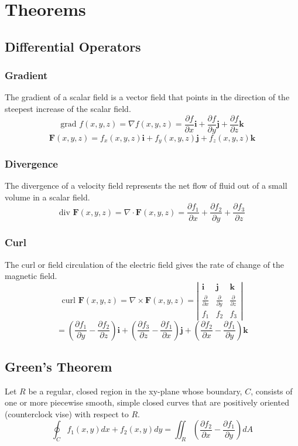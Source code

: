 \section{Theorems}
\subsection{Differential Operators}
\subsubsection{Gradient}
The gradient of a scalar field is a vector field that points in the direction of the steepest increase of the scalar field.
$$\text{grad }f(x,y,z)=\nabla f(x,y,z)=\frac{ \partial f }{ \partial x } \mathbf{i}+\frac{ \partial f }{ \partial y } \mathbf{j}+\frac{ \partial f }{ \partial z } \mathbf{k}$$
$$\mathbf{F}(x,y,z)=f_x(x,y,z)\mathbf{i}+f_y(x,y,z)\mathbf{j}+f_z(x,y,z)\mathbf{k}$$

\subsubsection{Divergence}
The divergence of a velocity field represents the net flow of fluid out of a small volume in a scalar field.
$$\text{div }\mathbf{F}(x,y,z)=\nabla \cdot \mathbf{F}(x,y,z)=\frac{ \partial f_{1} }{ \partial x } +\frac{ \partial f_{2} }{ \partial y } +\frac{ \partial f_{3} }{ \partial z } $$

\subsubsection{Curl}
The curl or field circulation of the electric field gives the rate of change of the magnetic field.
$$\text{curl }\mathbf{F}(x,y,z)
=\nabla \times \mathbf{F}(x,y,z)
=\left|\begin{array}{ccc}\mathbf{i} & \mathbf{j} & \mathbf{k} \\
\frac{ \partial  }{ \partial x } & \frac{ \partial  }{ \partial y } & \frac{ \partial  }{ \partial z } \\
f_{1} & f_{2} & f_{3} \end{array}\right|$$
$$=\left(\frac{ \partial f_{1} }{ \partial y } -\frac{ \partial f_{2} }{ \partial z } \right)\mathbf{i}+\left(\frac{ \partial f_{3} }{ \partial z } -\frac{ \partial f_{1} }{ \partial x } \right)\mathbf{j}+\left(\frac{ \partial f_{2} }{ \partial x } -\frac{ \partial f_{1} }{ \partial y } \right)\mathbf{k}$$

\subsection{Green's Theorem}
Let $R$ be a regular, closed region in the xy-plane whose boundary, $C$, consists of one or more piecewise smooth, simple closed curves that are positively oriented (counterclock vise) with respect to $R$.
$$\oint_{ C } f_1(x, y) d x+f_2(x, y) d y=\iint_{ R }\left(\frac{\partial f_2}{\partial x}-\frac{\partial f_1}{\partial y}\right) d A$$

